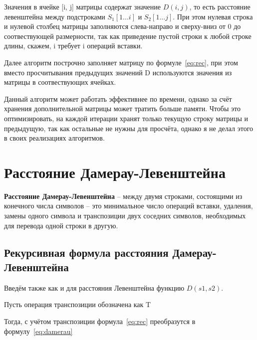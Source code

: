 Значения в ячейке [i, j] матрицы содержат значение $D(i, j)$, то есть расстояние левенштейна между подстроками $S_1[1...i]$ и $S_2[1...j]$.
При этом нулевая строка и нулевой столбец матрицы заполняются слева-направо и сверху-вниз от 0 до соотвествующей размерности,  так как приведение пустой строки к любой строке длины, скажем, i требует i операций вставки.

Далее алгоритм построчно заполняет матрицу по формуле~\ref{eq:rec}, при этом вместо просчитывания предыдущих значений D используются значения из матрицы в соотвествующих ячейках.

Данный алгоритм может работать эффективнее по времени, однако за счёт хранения дополнительной матрицы может тратить больше памяти. Чтобы это оптимизировать, на каждой итерации хранят только текущую строку матрицы и предыдущую, так как остальные не нужны для просчёта, однако я не делал этого в своих реализациях алгоритмов.

\section{Расстояние Дамерау-Левенштейна}

\textbf{Расстояние Дамерау-Левенштейна} -- между двумя строками, состоящими из конечного числа символов -- это минимальное число операций вставки, удаления, замены одного символа и транспозиции двух соседних символов, необходимых для перевода одной строки в другую.~\cite{itmo-damerau-levenstein}

\subsection{Рекурсивная формула расстояния Дамерау-Левенштейна}

Введём также как и для расстояния Левенштейна функцию $D(s1, s2)$. 

Пусть операция транспозиции обозначена как T

Тогда, с учётом транспозиции формула~\ref{eq:rec} преобразутся в формулу~\ref{eq:damerau}

